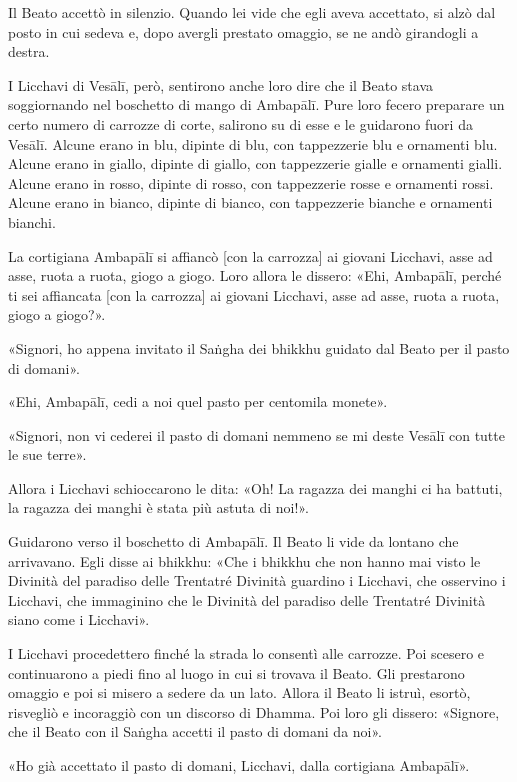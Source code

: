 Il Beato accettò in silenzio. Quando lei vide che egli aveva accettato,
si alzò dal posto in cui sedeva e, dopo avergli prestato omaggio, se ne
andò girandogli a destra.


I Licchavi di Vesālī, però, sentirono anche loro dire che il Beato stava
soggiornando nel boschetto di mango di Ambapālī. Pure loro fecero
preparare un certo numero di carrozze di corte, salirono su di esse e le
guidarono fuori da Vesālī. Alcune erano in blu, dipinte di blu, con
tappezzerie blu e ornamenti blu. Alcune erano in giallo, dipinte di
giallo, con tappezzerie gialle e ornamenti gialli. Alcune erano in
rosso, dipinte di rosso, con tappezzerie rosse e ornamenti rossi. Alcune
erano in bianco, dipinte di bianco, con tappezzerie bianche e ornamenti
bianchi.


La cortigiana Ambapālī si affiancò [con la carrozza] ai giovani
Licchavi, asse ad asse, ruota a ruota, giogo a giogo. Loro allora le
dissero: «Ehi, Ambapālī, perché ti sei affiancata [con la carrozza] ai
giovani Licchavi, asse ad asse, ruota a ruota, giogo a giogo?».


«Signori, ho appena invitato il Saṅgha dei bhikkhu guidato dal Beato per
il pasto di domani».


«Ehi, Ambapālī, cedi a noi quel pasto per centomila monete».


«Signori, non vi cederei il pasto di domani nemmeno se mi deste Vesālī
con tutte le sue terre».


Allora i Licchavi schioccarono le dita: «Oh! La ragazza dei manghi ci ha
battuti, la ragazza dei manghi è stata più astuta di noi!».


Guidarono verso il boschetto di Ambapālī. Il Beato li vide da lontano
che arrivavano. Egli disse ai bhikkhu: «Che i bhikkhu che non hanno mai
visto le Divinità del paradiso delle Trentatré Divinità guardino i
Licchavi, che osservino i Licchavi, che immaginino che le Divinità del
paradiso delle Trentatré Divinità siano come i Licchavi».


I Licchavi procedettero finché la strada lo consentì alle carrozze. Poi
scesero e continuarono a piedi fino al luogo in cui si trovava il Beato.
Gli prestarono omaggio e poi si misero a sedere da un lato. Allora il
Beato li istruì, esortò, risvegliò e incoraggiò con un discorso di
Dhamma. Poi loro gli dissero: «Signore, che il Beato con il Saṅgha
accetti il pasto di domani da noi».


«Ho già accettato il pasto di domani, Licchavi, dalla cortigiana
Ambapālī».


